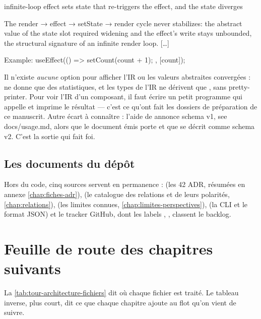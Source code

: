\begin{sortie}
infinite-loop
  effect sets state that re-triggers the effect, and the state diverges

The render → effect → setState → render cycle never stabilizes: the abstract value of the state slot required widening and the effect's write stays unbounded, the structural signature of an infinite render loop. […]

Example:
  useEffect(() => { setCount(count + 1); }, [count]);
\end{sortie}

\begin{piege}
Il n'existe \emph{aucune} option pour afficher l'IR ou les valeurs abstraites convergées :  ne donne que des statistiques, et les types de l'IR ne dérivent que , sans pretty-printer. Pour voir l'IR d'un composant, il faut écrire un petit programme qui appelle  et imprime le résultat --- c'est ce qu'ont fait les dossiers de préparation de ce manuscrit. Autre écart à connaître : l'aide de  annonce \og schema v1, see docs/usage.md\fg{}, alors que le document émis porte  et que  se décrit comme \og schema v2\fg{}. C'est la sortie qui fait foi.
\end{piege}

\subsection{Les documents du dépôt}

Hors du code, cinq sources servent en permanence :  (les 42 ADR, résumées en annexe \cref{chap:fiches-adr}),  (le catalogue des relations et de leurs polarités, \cref{chap:relations}),  (les limites connues, \cref{chap:limites-perspectives}),  (la CLI et le format JSON) et le tracker GitHub, dont les labels , ,  classent le backlog.

\section{Feuille de route des chapitres suivants}
\label{sec:tour-architecture-feuille-de-route}

La \cref{tab:tour-architecture-fichiers} dit où chaque fichier est traité. Le tableau inverse, plus court, dit ce que chaque chapitre ajoute au flot qu'on vient de suivre.

